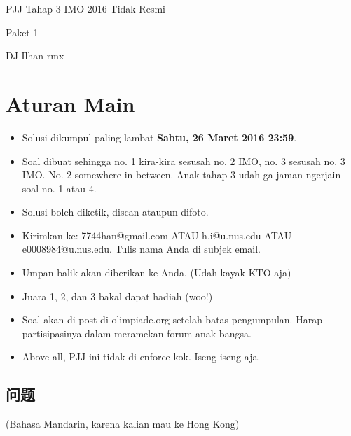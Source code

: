 \documentclass{article}
\begin{document}
	\begin{center}
		{\huge PJJ Tahap 3 IMO 2016 Tidak Resmi}
		
		\vspace{1em}
		
		{\Large Paket 1}
		
		\vspace{1em}
		
		DJ Ilhan rmx
	\end{center}
	\section{Aturan Main}
	\begin{itemize}
		\item Solusi dikumpul paling lambat \textbf{Sabtu, 26 Maret 2016 23:59}.
		\item Soal dibuat sehingga no. 1 kira-kira sesusah no. 2 IMO, no. 3 sesusah no. 3 IMO. No. 2 somewhere in between. Anak tahap 3 udah ga jaman ngerjain soal no. 1 atau 4.
		\item Solusi boleh diketik, discan ataupun difoto.
		\item Kirimkan ke: 7744han@gmail.com ATAU h.i@u.nus.edu ATAU e0008984@u.nus.edu. Tulis nama Anda di subjek email.
		\item Umpan balik akan diberikan ke Anda. (Udah kayak KTO aja)
		\item Juara 1, 2, dan 3 bakal dapat hadiah (woo!)
		\item Soal akan di-post di olimpiade.org setelah batas pengumpulan. Harap partisipasinya dalam meramekan forum anak bangsa.
		\item Above all, PJJ ini tidak di-enforce kok. Iseng-iseng aja.
	\end{itemize}
	\begin{CJK}{UTF8}{gbsn}
		\section{问题}
 	\end{CJK}
	(Bahasa Mandarin, karena kalian mau ke Hong Kong)
	\vspace{1em}
\end{document}
